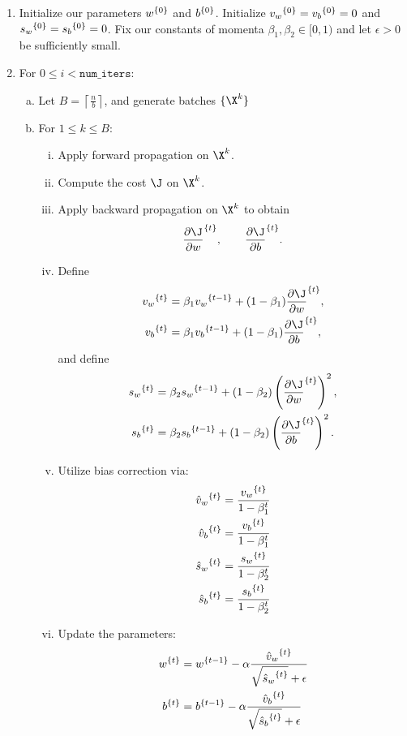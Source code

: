\begin{enumerate}
	\item Initialize our parameters ${w}^{\{{0}\}}$ and ${b}^{\{{0}\}}$.  Initialize ${v_w}^{\{{0}\}}={v_b}^{\{{0}\}}=0$ and ${s_w}^{\{{0}\}}={s_b}^{\{{0}\}}=0$.  Fix our constants of momenta $\beta_1,\beta_2\in[0,1)$ and let $\epsilon>0$ be sufficiently small.
	\item For $0\leq i <\texttt{num\_iters}$:
	\begin{enumerate}[a.]
		\item Let $B=\left\lceil\frac{n}{b}\right\rceil$, and generate batches $\{\X^k\}$
		\item For $1\leq k\leq B$:
		\begin{enumerate}[i.]
			\item Apply forward propagation on $\X^k$.
			\item Compute the cost $\J$ on $\X^k$.
			\item Apply backward propagation on $\X^k$ to obtain
			$$\iter{\frac{\partial\J}{\partial w}}{t},\qquad \iter{\frac{\partial\J}{\partial b}}{t}.$$
			\item Define
			\begin{align*}
				\iter{v_w}{t}&=\beta_1\iter{v_w}{t-1}+(1-\beta_1)\iter{\frac{\partial\J}{\partial w}}{t},\\
				\iter{v_b}{t}&=\beta_1\iter{v_b}{t-1}+(1-\beta_1)\iter{\frac{\partial\J}{\partial b}}{t},
			\end{align*}
			and define
			\begin{align*}
				\iter{s_w}{t}&=\beta_2\iter{s_w}{t-1}+(1-\beta_2)\left(\iter{\frac{\partial\J}{\partial w}}{t}\right)^2,\\
				\iter{s_b}{t}&=\beta_2\iter{s_b}{t-1}+(1-\beta_2)\left(\iter{\frac{\partial\J}{\partial b}}{t}\right)^2.
			\end{align*}
			\item Utilize bias correction via:
			\begin{align*}
				{\hat{v}_w}^{\{{t}\}}&=\frac{{v_w}^{\{{t}\}}}{1-\beta_1^t}\\
				{\hat{v}_b}^{\{{t}\}}&=\frac{{v_b}^{\{{t}\}}}{1-\beta_1^t}\\
				{\hat{s}_w}^{\{{t}\}}&=\frac{{s_w}^{\{{t}\}}}{1-\beta_2^t}\\
				{\hat{s}_b}^{\{{t}\}}&=\frac{{s_b}^{\{{t}\}}}{1-\beta_2^t}
			\end{align*}
			\item Update the parameters:
			\begin{align*}
				{w}^{\{{t}\}}&={w}^{\{{t-1}\}}-\alpha\frac{{\hat{v}_w}^{\{{t}\}}}{\sqrt{{\hat{s}_w}^{\{{t}\}}}+\epsilon}\\
				{b}^{\{{t}\}}&={b}^{\{{t-1}\}}-\alpha\frac{{\hat{v}_b}^{\{{t}\}}}{\sqrt{{\hat{s}_b}^{\{{t}\}}}+\epsilon}
			\end{align*}
		\end{enumerate}
	\end{enumerate}
\end{enumerate}

